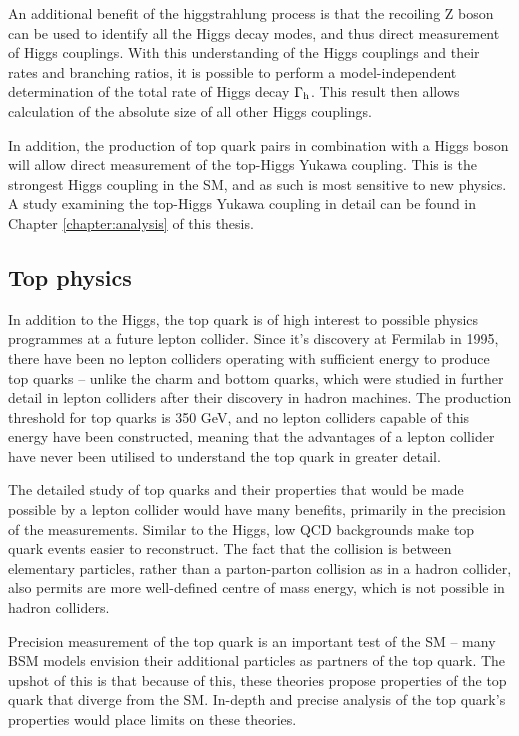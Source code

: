 An additional benefit of the higgstrahlung process is that the recoiling Z boson can be used to identify all the Higgs decay modes, and thus direct measurement of Higgs couplings. With this understanding of the Higgs couplings and their rates and branching ratios, it is possible to perform a model-independent determination of the total rate of Higgs decay $\Gamma\textsubscript{h}$. This result then allows calculation of the absolute size of all other Higgs couplings.

In addition, the production of top quark pairs in combination with a Higgs boson will allow direct measurement of the top-Higgs Yukawa coupling. This is the strongest Higgs coupling in the \acrshort{SM}, and as such is most sensitive to new physics. A study examining the top-Higgs Yukawa coupling in detail can be found in Chapter \ref{chapter:analysis} of this thesis.

\subsection{Top physics}
In addition to the Higgs, the top quark is of high interest to possible physics programmes at a future lepton collider. Since it's discovery at Fermilab in 1995, there have been no lepton colliders operating with sufficient energy to produce top quarks -- unlike the charm and bottom quarks, which were studied in further detail in lepton colliders after their discovery in hadron machines. The production threshold for top quarks is 350 GeV, and no lepton colliders capable of this energy have been constructed, meaning that the advantages of a lepton collider have never been utilised to understand the top quark in greater detail. 

The detailed study of top quarks and their properties that would be made possible by a lepton collider would have many benefits, primarily in the precision of the measurements. Similar to the Higgs, low \acrshort{QCD} backgrounds make top quark events easier to reconstruct. The fact that the collision is between elementary particles, rather than a parton-parton collision as in a hadron collider, also permits are more well-defined centre of mass energy, which is not possible in hadron colliders.

Precision measurement of the top quark is an important test of the \acrshort{SM} -- many \acrshort{BSM} models envision their additional particles as partners of the top quark. The upshot of this is that because of this, these theories propose properties of the top quark that diverge from the SM. In-depth and precise analysis of the top quark's properties would place limits on these theories.

